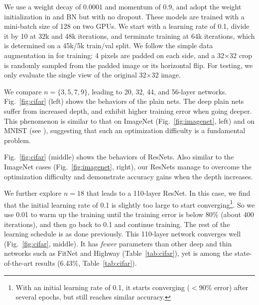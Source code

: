 \documentclass[10pt,twocolumn,letterpaper]{article}
\begin{document}
We use a weight decay of 0.0001 and momentum of 0.9, and adopt the weight initialization in \cite{He2015} and BN \cite{Ioffe2015} but with no dropout. These models are trained with a mini-batch size of 128 on two GPUs. We start with a learning rate of 0.1, divide it by 10 at 32k and 48k iterations, and terminate training at 64k iterations, which is determined on a 45k/5k train/val split. We follow the simple data augmentation in \cite{Lee2014} for training: 4 pixels are padded on each side, and a 32$\times$32 crop is randomly sampled from the padded image or its horizontal flip. For testing, we only evaluate the single view of the original 32$\times$32 image.

We compare $n=\{3,5,7,9\}$, leading to 20, 32, 44, and 56-layer networks.
Fig.~\ref{fig:cifar} (left) shows the behaviors of the plain nets. The deep plain nets suffer from increased depth, and exhibit higher training error when going deeper. This phenomenon is similar to that on ImageNet (Fig.~\ref{fig:imagenet}, left) and on MNIST (see \cite{Srivastava2015}), suggesting that such an optimization difficulty is a fundamental problem.

Fig.~\ref{fig:cifar} (middle) shows the behaviors of ResNets. Also similar to the ImageNet cases (Fig.~\ref{fig:imagenet}, right), our ResNets manage to overcome the optimization difficulty and demonstrate accuracy gains when the depth increases.

We further explore $n=18$ that leads to a 110-layer ResNet. In this case, we find that the initial learning rate of 0.1 is slightly too large to start converging\footnote{With an initial learning rate of 0.1, it starts converging ($<$90\% error) after several epochs, but still reaches similar accuracy.}. So we use 0.01 to warm up the training until the training error is below 80\% (about 400 iterations), and then go back to 0.1 and continue training. The rest of the learning schedule is as done previously. This 110-layer network converges well (Fig.~\ref{fig:cifar}, middle). It has \emph{fewer} parameters than other deep and thin networks such as FitNet \cite{Romero2015} and Highway \cite{Srivastava2015} (Table~\ref{tab:cifar}), yet is among the state-of-the-art results (6.43\%, Table~\ref{tab:cifar}).
\end{document}
